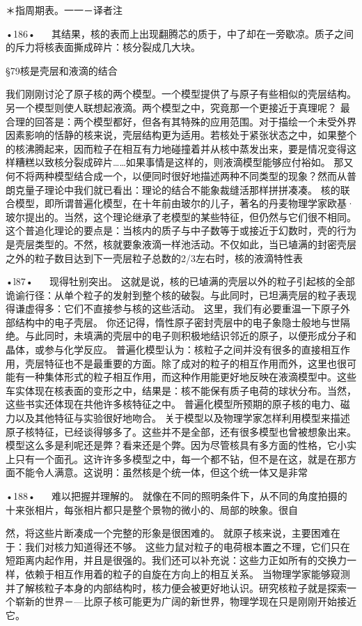 ＊指周期表。一一－译者注

•186•
  
其结果，核的表而上出现翻腾芯的质于，中了却在一旁歇凉。质子之间的斥力将核表面撕成碎片：核分裂成几大块。

§79核是壳层和液滴的结合

我们刚刚讨沦了原子核的两个模型。一个模型提供了与原子有些相似的壳层结构。另一个模型则使人联想起液滴。两个模型之中，究竟那一个更接近于真理呢？
最合理的回答是：两个模型都好，但各有其特殊的应用范围。对于描绘一个未受外界因素影响的恬静的核来说，壳层结构更为适用。若核处于紧张状态之中，如果整个的核沸腾起来，因而粒子在相互有力地碰撞着并从核中蒸发出来，要是情况变得这样糟糕以致核分裂成碎片……如果事情是这样的，则液滴模型能够应付裕如。
那又何不将两种模型结合成一个，以便同时很好地描述两种不同类型的现象？然而从普朗克量子理论中我们就已看出：理论的结合不能象裁缝活那样拼拼凑凑。
核的联合模型，即所谓普遍化模型，在十年前由玻尔的儿子，著名的丹麦物理学家欧基·玻尔提出的。当然，这个理论继承了老模型的某些特征，但仍然与它们很不相同。
这个普追化理论的要点是：当核内的质子与中子数等于或接近于幻数时，壳的行为是壳层类型的。不然，核就要象液滴一样池活动。不仅如此，当已埴满的封密壳层之外的粒子数目达到下一壳层粒子总数的2/3左右时，核的液滴特性表

•l87•
  
现得牡别突出。
这就是说，核的已埴满的壳层以外的粒子引起核的全部诡谕行径：从单个粒子的发射到整个核的破裂。与此同时，已坦满壳层的粒子表现得谦虚得多：它们不直接参与核的这些活动。
这里，我们有必要重温一下原子外部结构中的电子壳层。
你还记得，惰性原子密封壳层中的电子象隐士般地与世隔绝。与此同时，未填满的壳层中的电子则积极地结识邻近的原子，以便形成分子和晶体，或参与化学反应。
普遍化模型认为：核粒子之间并没有很多的直接相互作用，壳层特征也不是最重要的方面。除了成对的粒子的相互作用而外，这里也很可能有一种集体形式的粒子相互作用，而这种作用能更好地反映在液滴模型中。这些车实体现在核表面的变形之中，结果是：核不能保有质子电荷的球状分布。当然，这些书实还体现在共他许多核特征之中。
普遍化模型所预期的原子核的电力、磁力以及其他特征与实验很好地吻合。
关于模型以及物理学家怎样利用模型来描述原子核特征，已经谈得够多了。这些并不是全部，还有很多模型也曾被想象出来。
模型这么多是利呢还是弊？看来还是个弊。因为尽管核具有多方面的性格，它小实上只有一个面孔。这许许多多模型之中，每一个都不钻，但不是在这，就是在那方面不能令人满意。这说明：虽然核是个统一体，但这个统一体又是非常

•188•
  
难以把握并理解的。
就像在不同的照明条件下，从不同的角度拍摄的十来张相片，每张相片都只是整个景物的微小的、局部的映象。很自

然，将这些片断凑成一个完整的形象是很困难的。
就原子核来说，主要困难在于：我们对核力知道得还不够。
这些力鼠对粒子的电荷根本置之不理，它们只在短距离内起作用，并且是很强的。我们还可以补充说：这些力正如所有的交换力一样，依赖于相互作用着的粒子的自旋在方向上的相互关系。
当物理学家能够窥测并了解核粒子本身的内部结构时，核力便会被更好地认识。研究核粒子就是探索一个崭新的世界－—比原子核可能更为广阔的新世界，物理学现在只是刚刚开始接近它。

